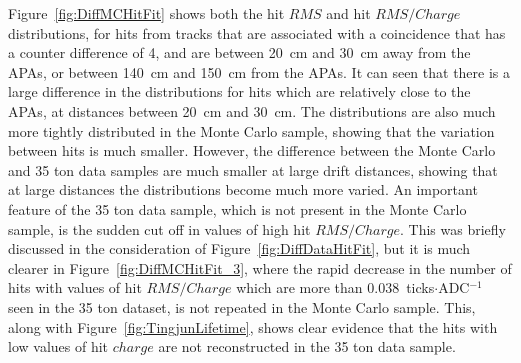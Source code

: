 Figure~\ref{fig:DiffMCHitFit} shows both the hit $RMS$ and hit $RMS/Charge$ distributions, for hits from tracks that are associated with a coincidence that has a counter difference of 4, and are between 20~cm and 30~cm away from the APAs, or between 140~cm and 150~cm from the APAs. It can seen that there is a large difference in the distributions for hits which are relatively close to the APAs, at distances between 20~cm and 30~cm. The distributions are also much more tightly distributed in the Monte Carlo sample, showing that the variation between hits is much smaller. However, the difference between the Monte Carlo and 35 ton data samples are much smaller at large drift distances, showing that at large distances the distributions become much more varied. An important feature of the 35 ton data sample, which is not present in the Monte Carlo sample, is the sudden cut off in values of high hit $RMS/Charge$. This was briefly discussed in the consideration of Figure~\ref{fig:DiffDataHitFit}, but it is much clearer in Figure~\ref{fig:DiffMCHitFit_3}, where the rapid decrease in the number of hits with values of hit $RMS/Charge$ which are more than 0.038~ticks$\cdot$ADC$^{-1}$ seen in the 35 ton dataset, is not repeated in the Monte Carlo sample. This, along with Figure~\ref{fig:TingjunLifetime}, shows clear evidence that the hits with low values of hit $charge$ are not reconstructed in the 35 ton data sample. \\  

